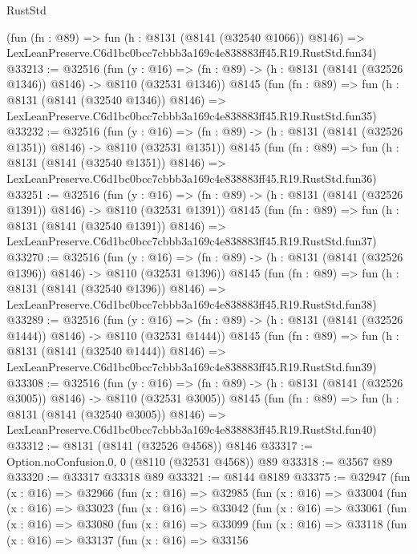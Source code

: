 \begin{lexlean}{RustStd}
\begin{coremodule}
    (fun (fn : @89) =>
    fun (h : @8131 (@8141 (@32540 @1066)) @8146) =>
    LexLeanPreserve.C6d1bc0bcc7cbbb3a169c4e838883ff45.R19.RustStd.fun34)
@33213 := @32516
    (fun (y : @16) =>
    (fn : @89) -> (h : @8131 (@8141 (@32526 @1346)) @8146) -> @8110 (@32531 @1346))
    @8145
    (fun (fn : @89) =>
    fun (h : @8131 (@8141 (@32540 @1346)) @8146) =>
    LexLeanPreserve.C6d1bc0bcc7cbbb3a169c4e838883ff45.R19.RustStd.fun35)
@33232 := @32516
    (fun (y : @16) =>
    (fn : @89) -> (h : @8131 (@8141 (@32526 @1351)) @8146) -> @8110 (@32531 @1351))
    @8145
    (fun (fn : @89) =>
    fun (h : @8131 (@8141 (@32540 @1351)) @8146) =>
    LexLeanPreserve.C6d1bc0bcc7cbbb3a169c4e838883ff45.R19.RustStd.fun36)
@33251 := @32516
    (fun (y : @16) =>
    (fn : @89) -> (h : @8131 (@8141 (@32526 @1391)) @8146) -> @8110 (@32531 @1391))
    @8145
    (fun (fn : @89) =>
    fun (h : @8131 (@8141 (@32540 @1391)) @8146) =>
    LexLeanPreserve.C6d1bc0bcc7cbbb3a169c4e838883ff45.R19.RustStd.fun37)
@33270 := @32516
    (fun (y : @16) =>
    (fn : @89) -> (h : @8131 (@8141 (@32526 @1396)) @8146) -> @8110 (@32531 @1396))
    @8145
    (fun (fn : @89) =>
    fun (h : @8131 (@8141 (@32540 @1396)) @8146) =>
    LexLeanPreserve.C6d1bc0bcc7cbbb3a169c4e838883ff45.R19.RustStd.fun38)
@33289 := @32516
    (fun (y : @16) =>
    (fn : @89) -> (h : @8131 (@8141 (@32526 @1444)) @8146) -> @8110 (@32531 @1444))
    @8145
    (fun (fn : @89) =>
    fun (h : @8131 (@8141 (@32540 @1444)) @8146) =>
    LexLeanPreserve.C6d1bc0bcc7cbbb3a169c4e838883ff45.R19.RustStd.fun39)
@33308 := @32516
    (fun (y : @16) =>
    (fn : @89) -> (h : @8131 (@8141 (@32526 @3005)) @8146) -> @8110 (@32531 @3005))
    @8145
    (fun (fn : @89) =>
    fun (h : @8131 (@8141 (@32540 @3005)) @8146) =>
    LexLeanPreserve.C6d1bc0bcc7cbbb3a169c4e838883ff45.R19.RustStd.fun40)
@33312 := @8131 (@8141 (@32526 @4568)) @8146
@33317 := Option.noConfusion.{0, 0} (@8110 (@32531 @4568)) @89
@33318 := @3567 @89
@33320 := @33317 @33318 @89
@33321 := @8144 @8189
@33375 := @32947
    (fun (x : @16) =>
    @32966
      (fun (x : @16) =>
      @32985
        (fun (x : @16) =>
        @33004
          (fun (x : @16) =>
          @33023
            (fun (x : @16) =>
            @33042
              (fun (x : @16) =>
              @33061
                (fun (x : @16) =>
                @33080
                  (fun (x : @16) =>
                  @33099
                    (fun (x : @16) =>
                    @33118
                      (fun (x : @16) =>
                      @33137
                        (fun (x : @16) =>
                        @33156

\end{coremodule}
\end{lexlean}
